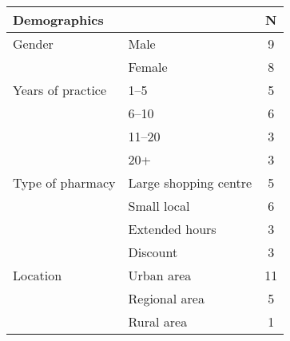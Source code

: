 \begin{table}[htb]
\centering
\begin{tabular}{llc}
\hline
\multicolumn{2}{l}{\textbf{Demographics}}                                                                                                                   & \textbf{N}  \T\B\\
\hline
Gender            & Male                                                                                                                           & 9  \T\\
                  & Female                                                                                                                         & 8  \\
Years of practice & 1--5                                                                                                                            & 5  \\
                  & 6--10                                                                                                                           & 6  \\
                  & 11--20                                                                                                                          & 3  \\
                  & 20+                                                                                                                            & 3  \\
Type of pharmacy  & Large shopping centre                                                                                                          & 5  \\
                  & Small local                                                                                                                    & 6  \\
                  & Extended hours                                                                                                                 & 3  \\
                  & Discount                                                                                                                       & 3  \\
Location          & Urban area                                                                                              & 11 \\
                  & Regional area  & 5  \\
                  & Rural area              & 1  \\

\end{tabular}
\end{table}
